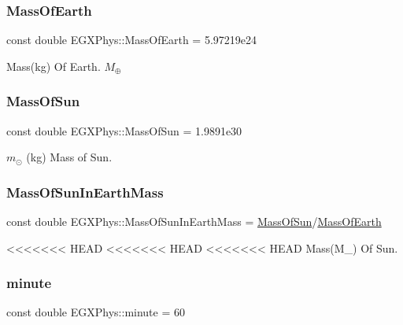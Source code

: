 \subsubsection{\texorpdfstring{Mass\+Of\+Earth}{MassOfEarth}}
{\footnotesize\ttfamily const double E\+G\+X\+Phys\+::\+Mass\+Of\+Earth = 5.\+97219e24}

Mass(kg) Of Earth. $M_\oplus$ \mbox{\label{namespace_e_g_x_phys_a6e84ae13f1dbcecb215af787bbc12cd6}} 
\subsubsection{\texorpdfstring{Mass\+Of\+Sun}{MassOfSun}}
{\footnotesize\ttfamily const double E\+G\+X\+Phys\+::\+Mass\+Of\+Sun = 1.\+9891e30}

$m_\odot$ (kg) Mass of Sun. \mbox{\label{namespace_e_g_x_phys_a05709972a6a6089eb968f667ce0bf656}} 
\subsubsection{\texorpdfstring{Mass\+Of\+Sun\+In\+Earth\+Mass}{MassOfSunInEarthMass}}
{\footnotesize\ttfamily const double E\+G\+X\+Phys\+::\+Mass\+Of\+Sun\+In\+Earth\+Mass = \hyperlink{namespace_e_g_x_phys_a6e84ae13f1dbcecb215af787bbc12cd6}{Mass\+Of\+Sun}/\hyperlink{namespace_e_g_x_phys_ace4a9d8c0b21215536857f4c1087a4e8}{Mass\+Of\+Earth}}

<<<<<<< HEAD
<<<<<<< HEAD
<<<<<<< HEAD
Mass(M\+\_\+) Of Sun. \mbox{\label{namespace_e_g_x_phys_ab3a72a63e9c502847d0db88a167dc02b}} 
\subsubsection{\texorpdfstring{minute}{minute}}
{\footnotesize\ttfamily const double E\+G\+X\+Phys\+::minute = 60}

